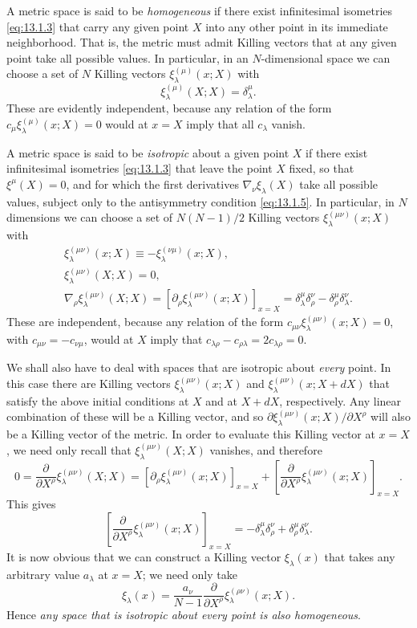 A metric space is said to be \emph{homogeneous} if there exist infinitesimal
isometries \eqref{eq:13.1.3} that carry any given point \(X\) into any other
point in its immediate neighborhood. That is, the metric must admit Killing
vectors that at any given point take all possible values. In particular, in
an \(N\)-dimensional space we can choose a set of \(N\) Killing vectors
\(\xi_\lambda^{(\mu)}(x;X)\) with
\[
  \xi_\lambda^{(\mu)}(X;X)=\delta_\lambda^\mu.
\]
These are evidently independent, because any relation of the form
\(c_\mu\xi_\lambda^{(\mu)}(x;X)=0\) would at \(x=X\) imply that all
\(c_\lambda\) vanish.

A metric space is said to be \emph{isotropic} about a given point \(X\) if
there exist infinitesimal isometries \eqref{eq:13.1.3} that leave the point
\(X\) fixed, so that \(\xi^\mu(X)=0\), and for which the first derivatives
\(\nabla_\nu\xi_\lambda(X)\) take all possible values, subject only to the
antisymmetry condition \eqref{eq:13.1.5}. In particular, in \(N\)
dimensions we can choose a set of \(N(N-1)/2\) Killing vectors
\(\xi_\lambda^{(\mu\nu)}(x;X)\) with
\begin{gather*}
  \xi_\lambda^{(\mu\nu)}(x;X)
  \equiv-\xi_\lambda^{(\nu\mu)}(x;X),\\
  \xi_\lambda^{(\mu\nu)}(X;X)=0,\\
  \nabla_\rho\xi_\lambda^{(\mu\nu)}(X;X)
  =
  \left[
    \partial_\rho\xi_\lambda^{(\mu\nu)}(x;X)
  \right]_{x=X}
  =
  \delta_\lambda^\mu\delta_\rho^\nu
  -\delta_\rho^\mu\delta_\lambda^\nu.
\end{gather*}
These are independent, because any relation of the form
\(c_{\mu\nu}\xi_\lambda^{(\mu\nu)}(x;X)=0\), with
\(c_{\mu\nu}=-c_{\nu\mu}\), would at \(X\) imply that
\(c_{\lambda\rho}-c_{\rho\lambda}=2c_{\lambda\rho}=0\).

We shall also have to deal with spaces that are isotropic about \emph{every}
point. In this case there are Killing vectors
\(\xi_\lambda^{(\mu\nu)}(x;X)\) and
\(\xi_\lambda^{(\mu\nu)}(x;X+dX)\) that satisfy the above initial
conditions at \(X\) and at \(X+dX\), respectively. Any linear combination
of these will be a Killing vector, and so
\(\partial\xi_\lambda^{(\mu\nu)}(x;X)/\partial X^\rho\) will also be a
Killing vector of the metric. In order to evaluate this Killing vector at
\(x=X\), we need only recall that \(\xi_\lambda^{(\mu\nu)}(X;X)\)
vanishes, and therefore
\[
  0
  =
  \frac{\partial}{\partial X^\rho}
  \xi_\lambda^{(\mu\nu)}(X;X)
  =
  \left[
    \partial_\rho\xi_\lambda^{(\mu\nu)}(x;X)
  \right]_{x=X}
  +
  \left[
    \frac{\partial}{\partial X^\rho}
    \xi_\lambda^{(\mu\nu)}(x;X)
  \right]_{x=X}.
\]
This gives
\[
  \left[
    \frac{\partial}{\partial X^\rho}
    \xi_\lambda^{(\mu\nu)}(x;X)
  \right]_{x=X}
  =
  -\delta_\lambda^\mu\delta_\rho^\nu
  +\delta_\rho^\mu\delta_\lambda^\nu.
\]
It is now obvious that we can construct a Killing vector \(\xi_\lambda(x)\)
that takes any arbitrary value \(a_\lambda\) at \(x=X\); we need only take
\[
  \xi_\lambda(x)
  =
  \frac{a_\nu}{N-1}
  \frac{\partial}{\partial X^\rho}
  \xi_\lambda^{(\rho\nu)}(x;X).
\]
Hence \emph{any space that is isotropic about every point is also
homogeneous}.


